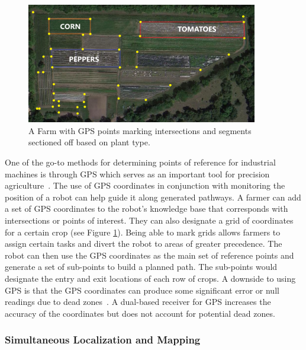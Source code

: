 \documentclass[12pt]{article}
\begin{document}
\begin{figure}[h]
\centering
\includegraphics[width=0.90\textwidth]{farmgps.png}
\caption{A Farm with GPS points marking intersections and segments sectioned off based on plant type.}
\label{fig:farm}
\end{figure}

One of the go-to methods for determining points of reference for industrial machines is through GPS which serves as an important tool for precision agriculture~\cite{pandey2021evaluation}. The use of GPS coordinates in conjunction with monitoring the position of a robot can help guide it along generated pathways. A farmer can add a set of GPS coordinates to the robot's knowledge base that corresponds with intersections or points of interest. They can also designate a grid of coordinates for a certain crop (see Figure \ref{fig:farm}). Being able to mark grids allows farmers to assign certain tasks and divert the robot to areas of greater precedence. The robot can then use the GPS coordinates as the main set of reference points and generate a set of sub-points to build a planned path. The sub-points would designate the entry and exit locations of each row of crops. A downside to using GPS is that the GPS coordinates can produce some significant error or null readings due to dead zones~\cite{pandey2021evaluation}. A dual-based receiver for GPS increases the accuracy of the coordinates but does not account for potential dead zones.

\subsubsection{Simultaneous Localization and Mapping}
\end{document}
